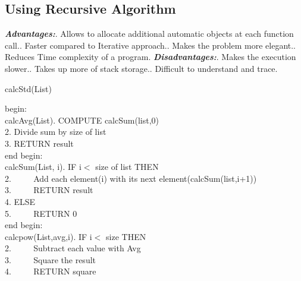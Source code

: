 \documentclass[a4paper,11pt]{article}
\begin{document}
\begin{titlepage}
\subsection{Using Recursive Algorithm}  
\textbf{\textit{Advantages:}}. Allows to allocate additional automatic objects at each function call.. Faster compared to Iterative approach.. Makes the problem more elegant.. Reduces Time complexity of a program.\newline
\textbf{\textit{Disadvantages:}}. Makes the execution slower.. Takes up more of stack storage.. Difficult to understand and trace.\newline
\begin{algorithm}
\caption{calcStd(List)}
begin:\\
calcAvg(List). COMPUTE calcSum(list,0)\\
2. Divide sum by size of list\\
3. RETURN result\\
end\newline
begin:\\
calcSum(List, i). IF i$<$ size of list THEN\\
2. $\hspace{2em}$ Add each element(i) with its next element(calcSum(list,i+1))\\
3. $\hspace{2em}$ RETURN result\\
4. ELSE\\
5. $\hspace{2em}$ RETURN 0\\
end\newline
begin:\\
calcpow(List,avg,i). IF i$<$ size THEN\\
2. $\hspace{2em}$ Subtract each value with Avg \\
3. $\hspace{2em}$ Square the result\\
4.  $\hspace{2em}$ RETURN square\\

\end{algorithm}
\end{titlepage}
\end{document}

